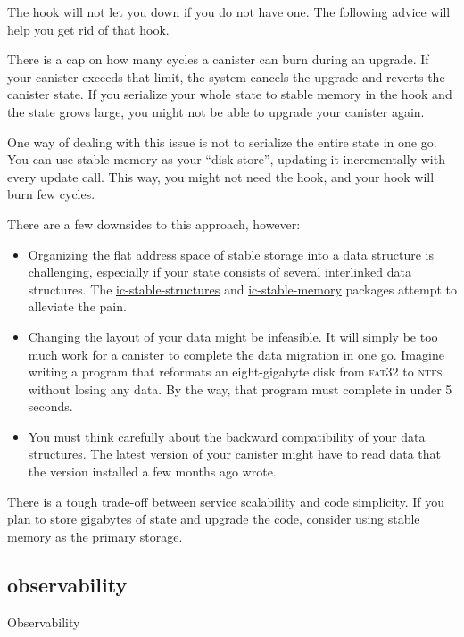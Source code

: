 \documentclass{article}
\begin{document}
The  hook will not let you down if you do not have one.
The following advice will help you get rid of that hook.


There is a cap on how many cycles a canister can burn during an upgrade.
If your canister exceeds that limit, the system cancels the upgrade and reverts the canister state.
If you serialize your whole state to stable memory in the  hook and the state grows large, you might not be able to upgrade your canister again.

One way of dealing with this issue is not to serialize the entire state in one go.
You can use stable memory as your ``disk store'', updating it incrementally with every update call.
This way, you might not need the  hook, and your  hook will burn few cycles.

There are a few downsides to this approach, however:
\begin{itemize}
\item
  Organizing the flat address space of stable storage into a data structure is challenging, especially if your state consists of several interlinked data structures.
  The \href{https://github.com/dfinity/stable-structures}{ic-stable-structures} and \href{https://github.com/seniorjoinu/ic-stable-memory}{ic-stable-memory} packages attempt to alleviate the pain.
\item
  Changing the layout of your data might be infeasible.
  It will simply be too much work for a canister to complete the data migration in one go.
  Imagine writing a program that reformats an eight-gigabyte disk from \textsc{fat32} to \textsc{ntfs} without losing any data.
  By the way, that program must complete in under 5 seconds.
\item
  You must think carefully about the backward compatibility of your data structures.
  The latest version of your canister might have to read data that the version installed a few months ago wrote.
\end{itemize}

There is a tough trade-off between service scalability and code simplicity.
If you plan to store gigabytes of state and upgrade the code, consider using stable memory as the primary storage.

\subsection{observability}{Observability}
\end{document}
